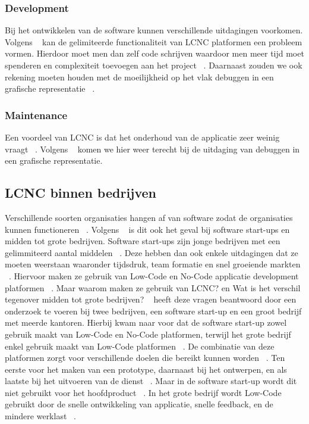 \subsubsection*{Development}
\label{sub:development}
Bij het ontwikkelen van de software kunnen verschillende uitdagingen voorkomen.
Volgens ~\textcite{Rokis_2022} kan de gelimiteerde functionaliteit van LCNC platformen een probleem vormen.
Hierdoor moet men dan zelf code schrijven waardoor men meer tijd moet spenderen en complexiteit toevoegen aan het project ~\autocite{Rokis_2022}.
Daarnaast zouden we ook rekening moeten houden met de moeilijkheid op het vlak debuggen in een grafische representatie ~\autocite{Rokis_2022}.
\subsubsection*{Maintenance}
\label{sub:maintenance}
Een voordeel van LCNC is dat het onderhoud van de applicatie zeer weinig vraagt ~\autocite{Rokis_2022}.
Volgens ~\textcite{Rokis_2022} komen we hier weer terecht bij de uitdaging van debuggen in een grafische representatie.

\subsection*{LCNC binnen bedrijven}
\label{sub:lcnc-binnen-bedrijven}
Verschillende soorten organisaties hangen af van software zodat de organisaties kunnen functioneren ~\autocite{Hintsch2021}.
Volgens ~\textcite{Rafiq_2022} is dit ook het geval bij software start-ups en midden tot grote bedrijven. 
Software start-ups zijn jonge bedrijven met een gelimmiteerd aantal middelen ~\autocite{Rafiq_2022}. 
Deze hebben dan ook enkele uitdagingen dat ze moeten weerstaan waaronder tijdsdruk, team formatie en snel groeiende markten ~\autocite{Rafiq_2022}.
Hiervoor maken ze gebruik van Low-Code en No-Code applicatie development platformen ~\autocite{Rafiq_2022}. 
Maar waarom maken ze gebruik van LCNC? en Wat is het verschil tegenover midden tot grote bedrijven?
~\textcite{Rafiq_2022} heeft deze vragen beantwoord door een onderzoek te voeren bij twee bedrijven, een software start-up en een groot bedrijf met meerde kantoren.
Hierbij kwam naar voor dat de software start-up zowel gebruik maakt van Low-Code en No-Code platformen, terwijl het grote bedrijf enkel gebruik maakt van Low-Code platformen ~\textcite{Rafiq_2022}.
De combinatie van deze platformen zorgt voor verschillende doelen die bereikt kunnen worden ~\autocite{Rafiq_2022}.
Ten eerste voor het maken van een prototype, daarnaast bij het ontwerpen, en als laatste bij het uitvoeren van de dienst ~\autocite{Rafiq_2022}.
Maar in de software start-up wordt dit niet gebruikt voor het hoofdproduct ~\autocite{Rafiq_2022}. In het grote bedrijf wordt Low-Code
gebruikt door de snelle ontwikkeling van applicatie, snelle feedback, en de mindere werklast ~\autocite{Rafiq_2022}.
